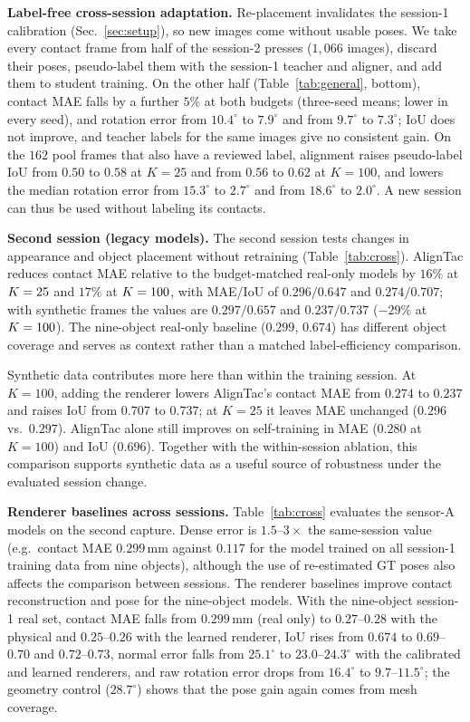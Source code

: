 \noindent\textbf{Label-free cross-session adaptation.} Re-placement invalidates the session-1 calibration (Sec.~\ref{sec:setup}), so new images come without usable poses. We take every contact frame from half of the session-2 presses ($1{,}066$ images), discard their poses, pseudo-label them with the session-1 teacher and aligner, and add them to student training. On the other half (Table~\ref{tab:general}, bottom), contact MAE falls by a further $5\%$ at both budgets (three-seed means; lower in every seed), and rotation error from $10.4^\circ$ to $7.9^\circ$ and from $9.7^\circ$ to $7.3^\circ$; IoU does not improve, and teacher labels for the same images give no consistent gain. On the $162$ pool frames that also have a reviewed label, alignment raises pseudo-label IoU from $0.50$ to $0.58$ at $K=25$ and from $0.56$ to $0.62$ at $K=100$, and lowers the median rotation error from $15.3^\circ$ to $2.7^\circ$ and from $18.6^\circ$ to $2.0^\circ$. A new session can thus be used without labeling its contacts.

\noindent\textbf{Second session (legacy models).}
The second session tests changes in appearance and object placement without retraining (Table~\ref{tab:cross}). AlignTac reduces contact MAE relative to the budget-matched real-only models by $16\%$ at $K=25$ and $17\%$ at $K=100$, with MAE/IoU of $0.296/0.647$ and $0.274/0.707$; with synthetic frames the values are $0.297/0.657$ and $0.237/0.737$ ($-29\%$ at $K=100$). The nine-object real-only baseline ($0.299$, $0.674$) has different object coverage and serves as context rather than a matched label-efficiency comparison.

Synthetic data contributes more here than within the training session. At $K=100$, adding the renderer lowers AlignTac's contact MAE from $0.274$ to $0.237$ and raises IoU from $0.707$ to $0.737$; at $K=25$ it leaves MAE unchanged ($0.296$ vs.\ $0.297$). AlignTac alone still improves on self-training in MAE ($0.280$ at $K=100$) and IoU ($0.696$). Together with the within-session ablation, this comparison supports synthetic data as a useful source of robustness under the evaluated session change.

\noindent\textbf{Renderer baselines across sessions.} Table~\ref{tab:cross} evaluates the sensor-A models on the second capture. Dense error is $1.5$--$3\times$ the same-session value (e.g.\ contact MAE $0.299\,$mm against $0.117$ for the model trained on all session-1 training data from nine objects), although the use of re-estimated GT poses also affects the comparison between sessions. The renderer baselines improve contact reconstruction and pose for the nine-object models. With the nine-object session-1 real set, contact MAE falls from $0.299\,$mm (real only) to $0.27$--$0.28$ with the physical and $0.25$--$0.26$ with the learned renderer, IoU rises from $0.674$ to $0.69$--$0.70$ and $0.72$--$0.73$, normal error falls from $25.1^\circ$ to $23.0$--$24.3^\circ$ with the calibrated and learned renderers, and raw rotation error drops from $16.4^\circ$ to $9.7$--$11.5^\circ$; the geometry control ($28.7^\circ$) shows that the pose gain again comes from mesh coverage.

